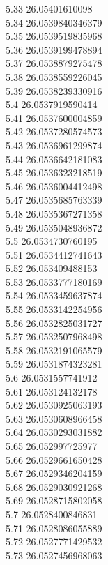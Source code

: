 {5.33	26.05401610098\\
5.34	26.0539840346379\\
5.35	26.0539519835968\\
5.36	26.0539199478894\\
5.37	26.0538879275478\\
5.38	26.0538559226045\\
5.39	26.0538239330916\\
5.4	26.0537919590414\\
5.41	26.0537600004859\\
5.42	26.0537280574573\\
5.43	26.0536961299874\\
5.44	26.0536642181083\\
5.45	26.0536323218519\\
5.46	26.0536004412498\\
5.47	26.0535685763339\\
5.48	26.0535367271358\\
5.49	26.0535048936872\\
5.5	26.0534730760195\\
5.51	26.0534412741643\\
5.52	26.053409488153\\
5.53	26.0533777180169\\
5.54	26.0533459637874\\
5.55	26.0533142254956\\
5.56	26.0532825031727\\
5.57	26.0532507968498\\
5.58	26.0532191065579\\
5.59	26.0531874323281\\
5.6	26.0531557741912\\
5.61	26.053124132178\\
5.62	26.0530925063193\\
5.63	26.0530608966458\\
5.64	26.0530293031882\\
5.65	26.052997725977\\
5.66	26.0529661650428\\
5.67	26.0529346204159\\
5.68	26.0529030921268\\
5.69	26.0528715802058\\
5.7	26.0528400846831\\
5.71	26.0528086055889\\
5.72	26.0527771429532\\
5.73	26.0527456968063\\
}
